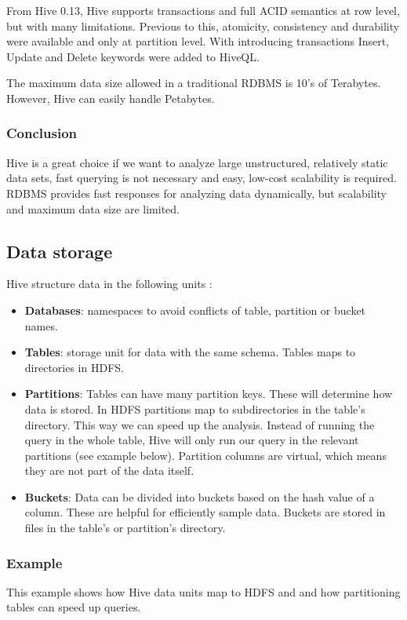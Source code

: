 From Hive 0.13, Hive supports transactions \cite{Hive-transactions} and full ACID semantics at row level, but with many limitations. Previous to this, atomicity, consistency and durability were available and only at partition level. With introducing transactions Insert, Update and Delete keywords were added to HiveQL. 

The maximum data size allowed in a traditional RDBMS is 10's of Terabytes. However, Hive can easily handle Petabytes.

\subsubsection*{Conclusion}
Hive is a great choice if we want to analyze large unstructured, relatively static data sets, fast querying is not necessary and easy, low-cost scalability is required. RDBMS provides fast responses for analyzing data dynamically, but scalability and maximum data size are limited.

\subsection{Data storage}
Hive structure data in the following units  \cite{Hive-paper, Hive-data-units}:
\begin{itemize}
\item \textbf{Databases}: namespaces to avoid conflicts of table, partition or bucket names.
\item \textbf{Tables}: storage unit for data with the same schema. Tables maps to directories in HDFS.
\item \textbf{Partitions}: Tables can have many partition keys. These will determine how data is stored. In HDFS partitions map to subdirectories in the table's directory. This way we can speed up the analysis. Instead of running the query in the whole table, Hive will only run our query in the relevant partitions (see example below). Partition columns are virtual, which means they are not part of the data itself.
\item \textbf{Buckets}: Data can be divided into buckets based on the hash value of a column. These are helpful for efficiently sample data. Buckets are stored in files in the table's or partition's directory.
\end{itemize}

\subsubsection*{Example}
This example shows how Hive data units map to HDFS and and how partitioning tables can speed up queries.

